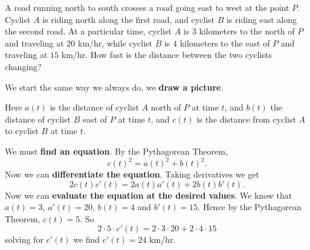 \begin{example}
A road running north to south crosses a road going east to west at the
point $P$.  Cyclist $A$ is riding north along the first road, and cyclist $B$ is
riding east along the second road.  At a particular time, cyclist $A$ is $3$
kilometers to the north of $P$ and traveling at $20$ km/hr, while cyclist
$B$ is $4$ kilometers to the east of $P$ and traveling at $15$ km/hr.
How fast is the distance between the two cyclists changing?
\end{example}

\begin{solution}
We start the same way we always do, we \textbf{draw a picture}.


Here $a(t)$ is the distance of cyclist $A$ north of $P$ at time $t$,
and $b(t)$ the distance of cyclist $B$ east of $P$ at time $t$, and
$c(t)$ is the distance from cyclist $A$ to cyclist $B$ at time $t$.

We must \textbf{find an equation}.  By the Pythagorean Theorem,
\[
c(t)^2=a(t)^2+b(t)^2.
\] 
Now we can \textbf{differentiate the equation}. Taking derivatives we get 
\[
2c(t)c'(t)=2a(t)a'(t)+2b(t)b'(t).
\]
Now we can  \textbf{evaluate the equation at the desired values}.
We know that $a(t) = 3$, $a'(t) = 20$, $b(t) = 4$ and $b'(t) = 15$. Hence 
by the Pythagorean Theorem, $c(t) = 5$. So 
\[
2\cdot 5 \cdot c'(t) = 2 \cdot 3\cdot 20 + 2 \cdot 4 \cdot 15
\]
solving for $c'(t)$ we find $c'(t) = 24$ km/hr.
\end{solution}



